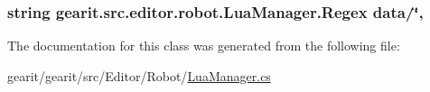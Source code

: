 \hypertarget{classgearit_1_1src_1_1editor_1_1robot_1_1_lua_manager_a21a92da7a2584882102819b50d0381e1}{
\subsubsection[{Regex}]{\setlength{\rightskip}{0pt plus 5cm}string gearit.\+src.\+editor.\+robot.\+Lua\+Manager.\+Regex data/\char`\"{}\hspace{0.3cm}{\ttfamily [static]}, {\ttfamily [get]}}}\label{classgearit_1_1src_1_1editor_1_1robot_1_1_lua_manager_a21a92da7a2584882102819b50d0381e1}


The documentation for this class was generated from the following file\+:\begin{DoxyCompactItemize}
\item 
gearit/gearit/src/\+Editor/\+Robot/\hyperlink{_lua_manager_8cs}{Lua\+Manager.\+cs}\end{DoxyCompactItemize}
